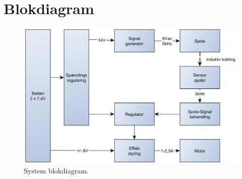 \section{Blokdiagram}
\begin{figure}[h!]
	\centering
	\includegraphics[width=.9\textwidth]{diagram/blokdiagram1.png}
	\caption{System blokdiagram.}
	\label{fig:blockdiagram1}
\end{figure}
\FloatBlock




